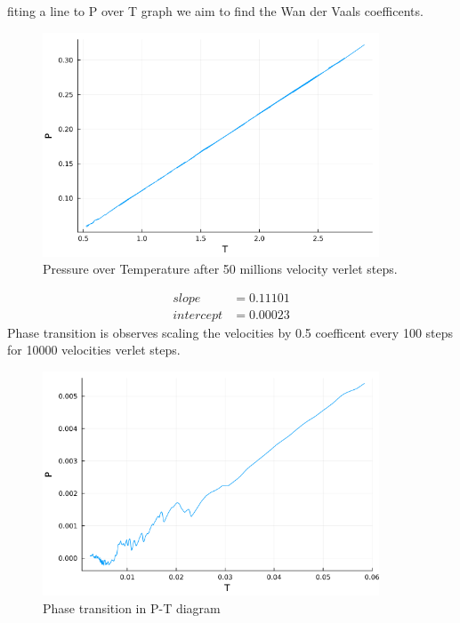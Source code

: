 \documentclass[12pt,a4paper]{article}
\begin{document}
		fiting a line to P over T graph we aim to find the Wan der Vaals coefficents.
		\begin{figure}[H]
			\centering
			\includegraphics[width=10cm]{Pt.png}
			\caption{Pressure over Temperature after 50 millions velocity verlet steps.}
		\end{figure}
		\begin{align*}
			slope &=  0.11101 \\
			intercept &= 0.00023 
		\end{align*} 
		Phase transition is observes scaling the velocities by 0.5 coefficent every 100 steps for 10000 velocities verlet steps.
		\begin{figure}[H]
			\centering
			\includegraphics[width=10cm]{phase.png}
			\caption{Phase transition in P-T diagram}
		\end{figure}

		
\end{document}
